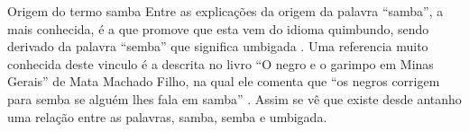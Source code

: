 
\begin{tcbinformation}{Origem do termo samba}
Entre as explicações da origem da palavra ``samba'', 
a mais conhecida, é a que promove que esta vem do idioma quimbundo, 
sendo derivado da palavra ``semba''  que significa umbigada \cite[pp. 32]{jornalsambaderoda2} \cite[pp. 47]{diniz2008almanaque} \cite[pp. 50]{da2015historia}.
Uma referencia muito conhecida deste vinculo é a descrita no livro ``O negro e o garimpo em Minas Gerais''
de Mata Machado Filho, na qual ele comenta que ``os negros corrigem para semba se 
alguém lhes fala em samba'' \cite[pp. 85]{sandroni2001feitico}. Assim se vê que existe
desde antanho uma relação entre as palavras, 
samba, semba e umbigada.
\end{tcbinformation}

